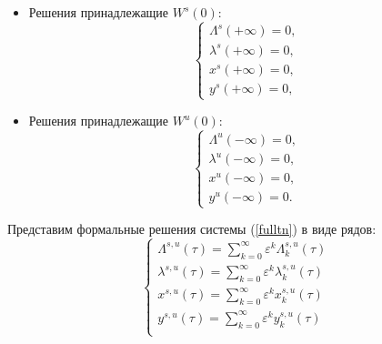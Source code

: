 \begin{itemize}
\item Решения принадлежащие $W^s(0)$:
\begin{equation*}
    \begin{cases}
        \Lambda^{s}(+ \infty) = 0, \\
        \lambda^{s}(+ \infty) = 0,\\
        x^{s}(+ \infty) = 0, \\
        y^{s}(+ \infty) = 0,
    \end{cases}
    \label{border}
\end{equation*}
\item Решения принадлежащие $W^u(0)$:
\begin{equation*}
    \begin{cases}
        \Lambda^{u}(- \infty) = 0, \\
        \lambda^{u}(- \infty) = 0,\\
        x^{u}(- \infty) = 0, \\
        y^{u}(- \infty) = 0.
    \end{cases}
\end{equation*}
\end{itemize}

   

    Представим формальные решения системы (\ref{fulltn}) в виде рядов:
    \begin{equation}
    \begin{cases}
\Lambda^{s,u}(\tau) = \sum_{k=0}^\infty \varepsilon^k \Lambda^{s,u}_k(\tau)\\
\lambda^{s,u}(\tau) = \sum_{k=0}^\infty \varepsilon^k \lambda^{s,u}_k(\tau)\\
x^{s,u}(\tau) =       \sum_{k=0}^\infty \varepsilon^k x^{s,u}_k(\tau)\\
y^{s,u}(\tau) =       \sum_{k=0}^\infty \varepsilon^k y^{s,u}_k(\tau)\\
\end{cases}
    \label{predst}
\end{equation}


